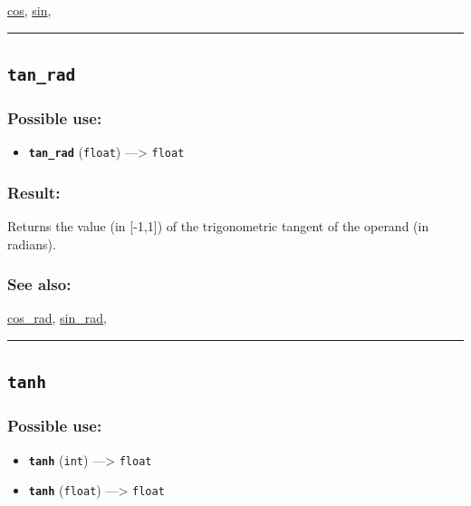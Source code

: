 \documentclass[]{book}
\providecommand{\tightlist}{%
  \setlength{\itemsep}{0pt}\setlength{\parskip}{0pt}}
\theoremstyle{definition}
\theoremstyle{definition}
\theoremstyle{definition}
\theoremstyle{remark}
\begin{document}
\href{operators-b-to-c.html\#cos}{cos},
\href{operators-s-to-z.html\#sin}{sin},

\begin{center}\rule{0.5\linewidth}{\linethickness}\end{center}

\subsection{\texorpdfstring{\texttt{tan\_rad}}{tan\_rad}}\label{tan_rad}

\subsubsection{Possible use:}\label{possible-use-513}

\begin{itemize}
\tightlist
\item
  \textbf{\texttt{tan\_rad}} (\texttt{float}) ---\textgreater{}
  \texttt{float}
\end{itemize}

\subsubsection{Result:}\label{result-496}

Returns the value (in {[}-1,1{]}) of the trigonometric tangent of the
operand (in radians).

\subsubsection{See also:}\label{see-also-202}

\href{operators-b-to-c.html\#cos_rad}{cos\_rad},
\href{operators-s-to-z.html\#sin_rad}{sin\_rad},

\begin{center}\rule{0.5\linewidth}{\linethickness}\end{center}

\subsection{\texorpdfstring{\texttt{tanh}}{tanh}}\label{tanh}

\subsubsection{Possible use:}\label{possible-use-514}

\begin{itemize}
\tightlist
\item
  \textbf{\texttt{tanh}} (\texttt{int}) ---\textgreater{} \texttt{float}
\item
  \textbf{\texttt{tanh}} (\texttt{float}) ---\textgreater{}
  \texttt{float}
\end{itemize}
\end{document}
